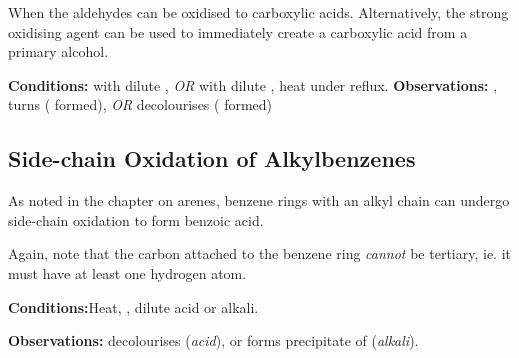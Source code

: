 			When the aldehydes can be oxidised to carboxylic acids. Alternatively, the strong oxidising agent  can be used to
			immediately create a carboxylic acid from a primary alcohol.

			\vspace{1.5em}
			\vbox{\textbf{Conditions:}	\tabto{35mm} with dilute , \textit{OR}  with dilute ,
										\tabto{35mm}heat under reflux.}
			\vspace{0.75em}
			\vbox{\textbf{Observations:}\tabto{35mm} , turns 
													( formed), \textit{OR}
										\tabto{35mm}  decolourises ( formed)}





		\pagebreak
		\subsection{Side-chain Oxidation of Alkylbenzenes}

			As noted in the chapter on arenes, benzene rings with an alkyl chain can undergo side-chain oxidation to form benzoic acid.

			Again, note that the carbon attached to the benzene ring \textit{cannot} be tertiary, ie. it must have at least one hydrogen atom.


			\vspace{1.5em}

			\vbox{\textbf{Conditions:}\tabto{35mm}Heat, , dilute acid or alkali.}

			\vspace{0.75em}
			\vbox{\textbf{Observations:}\tabto{35mm}  decolourises (\textit{acid}), or
										\tabto{35mm}forms  precipitate of  (\textit{alkali}).}

